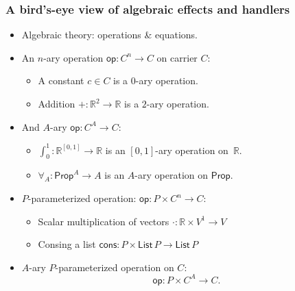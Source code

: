 \documentclass[11pt,aspectratio=169,fleqn]{beamer}
\begin{document}
\begin{frame}
  \frametitle{A bird's-eye view of algebraic effects and handlers}

  \begin{itemize}
  \item Algebraic theory: operations \& equations.
  \item\pause
    An $n$-ary operation $\mathsf{op} : C^n \to C$ on carrier $C$:
    \begin{itemize}
    \item A constant $c \in C$ is a $0$-ary operation.
    \item Addition ${+} : \mathbb{R}^2 \to \mathbb{R}$ is a $2$-ary operation.
    \end{itemize}
  \item \pause
    And $A$-ary $\mathsf{op} : C^A \to C$:
    \begin{itemize}
    \item $\int_0^1 : \mathbb{R}^{[0,1]} \to \mathbb{R}$ is an $[0,1]$-ary operation on~$\mathbb{R}$.
    \item $\forall_A : \mathsf{Prop}^A \to A$ is an $A$-ary operation on $\mathsf{Prop}$.
    \end{itemize}
  \item \pause
    $P$-parameterized operation: $\mathsf{op} : P \times C^n \to C$:
    \begin{itemize}
    \item Scalar multiplication of vectors ${\cdot} : \mathbb{R} \times V^1 \to V$
    \item Consing a list $\mathsf{cons} : P \times \mathsf{List}\,P \to \mathsf{List}\,P$
    \end{itemize}
  \item \pause
    $A$-ary $P$-parameterized operation on $C$:
    \begin{equation*}
      \mathsf{op} : P \times C^A \to C.
    \end{equation*}
  \end{itemize}
\end{frame}
\end{document}
